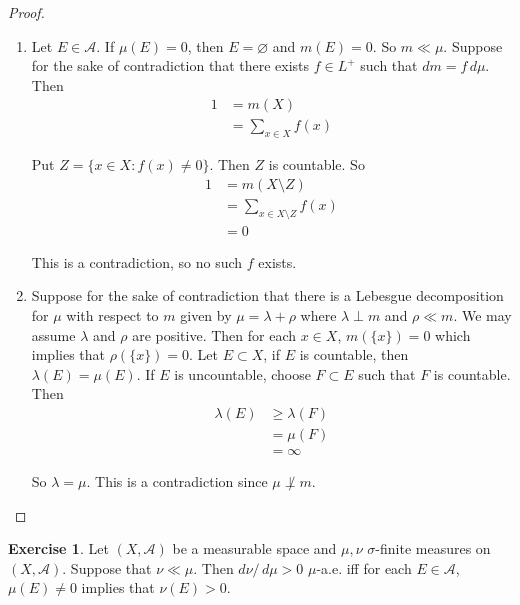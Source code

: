 \documentclass{book}
\theoremstyle{definition}
\newtheorem{ex}[definition]{Exercise}
\newcommand{\lam}{\lambda}
\newcommand{\sig}{\sigma}
\newcommand{\MA}{\mathcal{A}}
\DeclareMathOperator*{\0}{\mbf{0}}
\DeclareMathOperator*{\1}{\mbf{1}}
\newcommand{\dmu}{\, d \mu}
\begin{document}
	\begin{proof}
		\begin{enumerate}
			\item Let $E \in \MA$. If $\mu(E) = 0$, then $E = \varnothing$ and $m(E) = 0$. So $m \ll \mu$. Suppose for the sake of contradiction that there exists $f \in L^+$ such that $dm = f \dmu$. Then 
			\begin{align*}
				1
				&= m(X) \\
				&= \sum_{x \in X} f(x)
			\end{align*}
			
			Put $Z = \{x \in X: f(x) \neq 0 \}$. Then $Z$ is countable. So 
			\begin{align*}
				1
				&= m(X \setminus Z) \\
				&= \sum_{x \in X \setminus Z} f(x)\\
				&= 0
			\end{align*}
			
			This is a contradiction, so no such $f$ exists.
			
			\item Suppose for the sake of contradiction that there is a Lebesgue decomposition for $\mu$ with respect to $m$ given by $\mu = \lam + \rho$ where $\lam \perp m$ and $\rho \ll m$. We may assume $\lam$ and $\rho$ are positive. Then for each $x \in X$, $m(\{x\})=0$ which implies that $\rho(\{x\}) = 0$. Let $E \subset X$, if $E$ is countable, then $\lam(E) = \mu(E)$. If $E$ is uncountable, choose $F \subset E$ such that $F$ is countable. Then 
			\begin{align*}
				\lam(E) 
				& \geq \lam(F) \\
				& = \mu(F) \\
				&= \infty
			\end{align*}
			
			So $\lam = \mu$. This is a contradiction since $\mu \not \perp m$.
		\end{enumerate}
	\end{proof}
	
	\begin{ex}
		Let $(X, \MA)$ be a measurable space and $\mu, \nu$ $\sig$-finite measures on $(X, \MA)$. Suppose that $\nu \ll \mu$. Then $d\nu / \dmu > 0$ $\mu$-a.e. iff for each $E \in \MA$, $\mu(E) \neq 0$ implies that $\nu(E) > 0$. 
	\end{ex}
\end{document}
